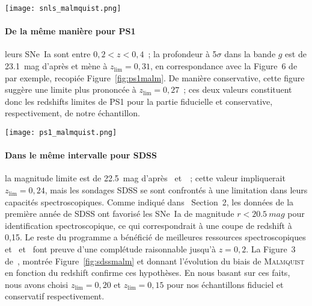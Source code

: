 \documentclass[../main/main.tex]{subfiles}
\begin{document}
\begin{SCfigure}[0.7][ht!]
    \centering
    \texttt{[image: snls\_malmquist.png]}
    \caption[Biais de \textsc{Malmquist} moyen en fonction du redshift pour le
    sondage SNLS]{Biais de \textsc{Malmquist} et de sélection spectroscopique
        moyen en fonction du redshift pour le sondage SNLS d'après des
        simulations.\smallbreak Figure de~\cite{perrett2010}.}
    \label{fig:snlsmalm}
\end{SCfigure}

\paragraph*{De la même manière pour PS1} leurs SNe~Ia sont entre $0,2 < z <
0,4$~; la profondeur à 5$\sigma$ dans la bande $g$ est de \SI{23,1}{mag} d'après
\cite{rest2014} et mène à $z_{\lim}=0,31$, en correspondance avec la Figure~6
de~\cite{scolnic2018} par exemple, recopiée Figure~\ref{fig:ps1malm}. De manière
conservative, cette figure suggère une limite plus prononcée à $z_{\lim}=0,27$~;
ces deux valeurs constituent donc les redshifts limites de PS1 pour la partie
fiducielle et conservative, respectivement, de notre échantillon.

\begin{SCfigure}[0.7][ht!]
    \centering
    \texttt{[image: ps1\_malmquist.png]}
    \caption[Biais de \textsc{Malmquist} moyen en fonction du redshift pour le
    sondage PS1]{Biais de \textsc{Malmquist} moyen dû aux effets de sélection
        en fonction du redshift pour le sondage PS1, d'après des simulations et
        pour deux modèles de dispersion intrinsèques différents et leur moyenne.
        \smallbreak Figure de~\cite{scolnic2018}.}
    \label{fig:ps1malm}
\end{SCfigure}

\paragraph*{Dans le même intervalle pour SDSS} la magnitude limite est de
\SI{22,5}{mag} d'après~\cite{dilday2008} et~\cite{sako2008}~; cette valeur 
impliquerait $z_{\lim}=0,24$, mais les sondages SDSS se sont confrontés à une
limitation dans leurs capacités spectroscopiques. Comme indiqué
dans~\cite{kessler2009a} Section~2, les données de la première année de SDSS ont
favorisé les SNe~Ia de magnitude $r < \SI{20,5}{mag}$ pour identification
spectroscopique, ce qui correspondrait à une coupe de redshift à 0,15. Le reste
du programme a bénéficié de meilleures ressources spectroscopiques
et~\cite{kessler2009a} et~\cite{dilday2008} font preuve d'une complétude
raisonnable jusqu'à $z=0,2$. La Figure~3 de~\cite{conley2011}, montrée
Figure~\ref{fig:sdssmalm} et donnant l'évolution du biais de \textsc{Malmquist}
en fonction du redshift confirme ces hypothèses. En nous basant sur ces faits,
nous avons choisi $z_{\lim}=0,20$ et $z_{\lim}=0,15$ pour nos échantillons
fiduciel et conservatif respectivement.
\end{document}
